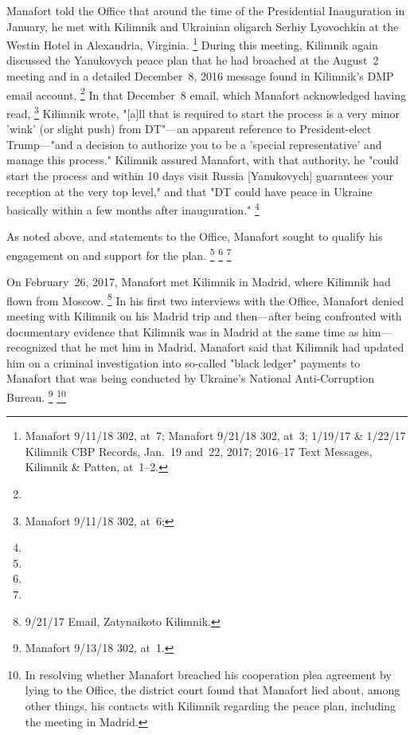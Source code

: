 Manafort told the Office that around the time of the Presidential Inauguration in January, he met with Kilimnik and Ukrainian oligarch Serhiy Lyovochkin at the Westin Hotel in Alexandria, Virginia.%
\footnote{ Manafort 9/11/18 302, at~7;
Manafort 9/21/18 302, at~3;
1/19/17 \& 1/22/17 Kilimnik CBP Records, Jan.~19 and~22, 2017;
2016--17 Text Messages, Kilimnik \& Patten, at~1--2.}
During this meeting, Kilimnik again discussed the Yanukovych peace plan that he had broached at the August~2 meeting and in a detailed December~8, 2016 message found in Kilimnik's DMP email account.%
\footnote{}
In that December~8 email, which Manafort acknowledged having read,%
\footnote{Manafort 9/11/18 302, at~6;
}
Kilimnik wrote, "[a]ll that is required to start the process is a very minor 'wink' (or slight push) from DT"---an apparent reference to President-elect Trump---"and a decision to authorize you to be a 'special representative' and manage this process."
Kilimnik assured Manafort, with that authority, he "could start the process and within 10 days visit Russia [Yanukovych] guarantees your reception at the very top level," and that "DT could have peace in Ukraine basically within a few months after inauguration."%
\footnote{}

As noted above,
and statements to the Office, Manafort sought to qualify his engagement on and support for the plan.
\footnote{}
\footnote{}
\footnote{}

On February~26, 2017, Manafort met Kilimnik in Madrid, where Kilimnik had flown from Moscow.%
\footnote{9/21/17 Email, Zatynaikoto Kilimnik.}
In his first two interviews with the Office, Manafort denied meeting with Kilimnik on his Madrid trip and then---after being confronted with documentary evidence that Kilimnik was in Madrid at the same time as him---recognized that he met him in Madrid.
Manafort said that Kilimnik had updated him on a criminal investigation into so-called "black ledger" payments to Manafort that was being conducted by Ukraine's National Anti-Corruption Bureau.%
\footnote{Manafort 9/13/18 302, at~1.}
\footnote{ In resolving whether Manafort breached his cooperation plea agreement by lying to the Office, the district court found that Manafort lied about, among other things, his contacts with Kilimnik regarding the peace plan, including the meeting in Madrid.}

